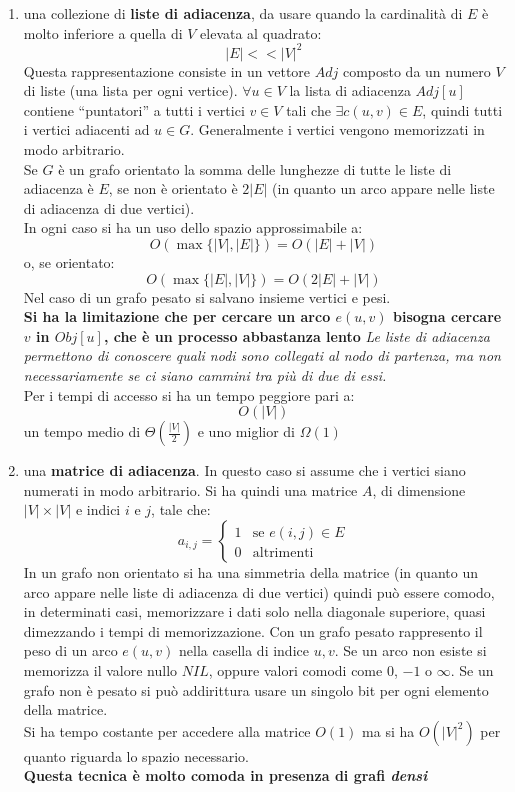 \documentclass[a4paper,12pt, oneside]{book}
\begin{document}
\begin{enumerate}
  \item una collezione di \textbf{liste di adiacenza}, da usare quando la
  cardinalità di $E$ è molto inferiore a quella di $V$ elevata al
  quadrato:
  \[|E|<< |V|^2\]
  Questa rappresentazione consiste in un vettore $Adj$ composto da un
  numero $V$ di liste (una lista per ogni vertice). $\forall u\in V$
  la lista di adiacenza $Adj[u]$ contiene ``puntatori'' a tutti i
  vertici $v\in V$ tali che $\exists c(u,v)\in E$, quindi tutti i
  vertici adiacenti ad $u\in G$. Generalmente i vertici vengono
  memorizzati in modo arbitrario.\\
  Se $G$ è un grafo orientato la somma delle lunghezze di tutte le
  liste di adiacenza è $E$, se non è orientato è $2|E|$ (in quanto un
  arco appare nelle liste di adiacenza di due vertici).\\
  In ogni caso si ha un uso dello spazio approssimabile a:
  \[O(\max\{|V|,|E|\})=O(|E|+|V|)\]
  o, se orientato:
  \[O(\max\{|E|,|V|\})=O(2|E|+|V|)\]
  Nel caso di un grafo pesato si salvano insieme vertici e pesi.\\
  \textbf{Si ha la limitazione che per cercare un arco $e(u,v)$
    bisogna cercare $v$ in $Obj[u]$, che è un processo abbastanza
    lento}
  \textit{Le liste di adiacenza permettono di conoscere quali nodi
    sono collegati al nodo di partenza, ma non necessariamente se ci
    siano cammini tra più di due di essi.}\\
  Per i tempi di accesso si ha un tempo peggiore pari a:
  \[O(|V|)\]
  un tempo medio di $\Theta(\frac{|V|}{2})$ e uno miglior di $\Omega(1)$
  \item una \textbf{matrice di adiacenza}. In questo caso si assume
  che i vertici siano numerati in modo arbitrario. Si ha quindi una
  matrice $A$, di dimensione $|V|\times |V|$ e indici $i$ e $j$, tale
  che:
  \[a_{i,j}=
    \begin{cases}
      1 & \mbox{se } e(i,j)\in E\\
      0 & \mbox{altrimenti}
    \end{cases}
  \]
  In un grafo non orientato si ha una simmetria della matrice (in quanto un
  arco appare nelle liste di adiacenza di due vertici) quindi può
  essere comodo, in determinati casi, memorizzare i dati solo nella
  diagonale superiore, quasi dimezzando i tempi di memorizzazione. Con
  un grafo pesato rappresento il peso di un arco $e(u,v)$ nella
  casella di indice $u,v$. Se un arco non esiste si memorizza il
  valore nullo $NIL$, oppure valori comodi come $0$, $-1$ o $\infty$. Se un
  grafo non è pesato si può addirittura usare un singolo bit per ogni
  elemento della matrice.\\
  Si ha tempo costante per accedere alla matrice $O(1)$ ma si ha
  $O(|V|^2)$ per quanto riguarda lo spazio necessario.\\
  \textbf{Questa tecnica è molto comoda in presenza di grafi \textit{densi}}
\end{enumerate}
\newpage
\end{document}
